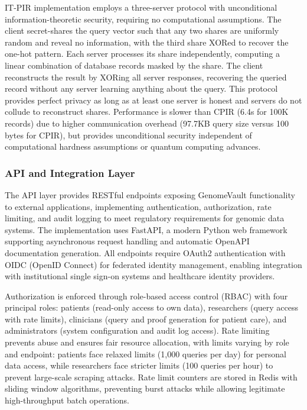 \documentclass[11pt,letterpaper]{article}
\begin{document}
IT-PIR implementation employs a three-server protocol with unconditional information-theoretic security, requiring no computational assumptions. The client secret-shares the query vector such that any two shares are uniformly random and reveal no information, with the third share XORed to recover the one-hot pattern. Each server processes its share independently, computing a linear combination of database records masked by the share. The client reconstructs the result by XORing all server responses, recovering the queried record without any server learning anything about the query. This protocol provides perfect privacy as long as at least one server is honest and servers do not collude to reconstruct shares. Performance is slower than CPIR (6.4s for 100K records) due to higher communication overhead (97.7KB query size versus 100 bytes for CPIR), but provides unconditional security independent of computational hardness assumptions or quantum computing advances.

\subsubsection{API and Integration Layer}

The API layer provides RESTful endpoints exposing GenomeVault functionality to external applications, implementing authentication, authorization, rate limiting, and audit logging to meet regulatory requirements for genomic data systems. The implementation uses FastAPI, a modern Python web framework supporting asynchronous request handling and automatic OpenAPI documentation generation. All endpoints require OAuth2 authentication with OIDC (OpenID Connect) for federated identity management, enabling integration with institutional single sign-on systems and healthcare identity providers.

Authorization is enforced through role-based access control (RBAC) with four principal roles: patients (read-only access to own data), researchers (query access with rate limits), clinicians (query and proof generation for patient care), and administrators (system configuration and audit log access). Rate limiting prevents abuse and ensures fair resource allocation, with limits varying by role and endpoint: patients face relaxed limits (1,000 queries per day) for personal data access, while researchers face stricter limits (100 queries per hour) to prevent large-scale scraping attacks. Rate limit counters are stored in Redis with sliding window algorithms, preventing burst attacks while allowing legitimate high-throughput batch operations.
\end{document}
